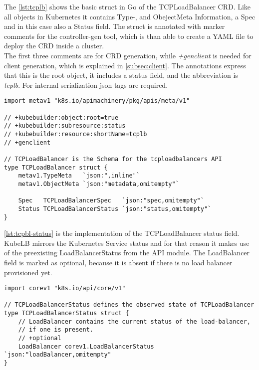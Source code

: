 The \autoref{lst:tcplb} shows the basic struct in Go of the TCPLoadBalancer CRD.
Like all objects in Kubernetes it contains Type-, and ObejectMeta Information, a Spec and in this case also a Status field.
The struct is annotated with marker comments for the controller-gen tool, which is than able to create a YAML file to deploy the CRD inside a cluster.
\\
The first three comments are for CRD generation, while \textit{+genclient} is needed for client generation, which is explained in \autoref{subsec:client}.
The annotations express that this is the root object, it includes a status field, and the abbreviation is \textit{tcplb}.
For internal serialization json tags are required.

\begin{lstlisting}[caption={TCPLoadBalancer CRD root struct},label={lst:tcplb}]
import metav1 "k8s.io/apimachinery/pkg/apis/meta/v1"

// +kubebuilder:object:root=true
// +kubebuilder:subresource:status
// +kubebuilder:resource:shortName=tcplb
// +genclient

// TCPLoadBalancer is the Schema for the tcploadbalancers API
type TCPLoadBalancer struct {
	metav1.TypeMeta   `json:",inline"`
	metav1.ObjectMeta `json:"metadata,omitempty"`

	Spec   TCPLoadBalancerSpec   `json:"spec,omitempty"`
	Status TCPLoadBalancerStatus `json:"status,omitempty"`
}
\end{lstlisting}

\newpage

\autoref{lst:tcpbl-status} is the implementation of the TCPLoadBalancer status field.
KubeLB mirrors the Kubernetes Service status and for that reason it makes use of the preexisting LoadBalancerStatus from the API module.
The LoadBalancer field is marked as optional, because it is absent if there is no load balancer provisioned yet.

\begin{lstlisting}[caption={TCPLoadBalancerStatus struct}, label={lst:tcpbl-status}]
import corev1 "k8s.io/api/core/v1"

// TCPLoadBalancerStatus defines the observed state of TCPLoadBalancer
type TCPLoadBalancerStatus struct {
	// LoadBalancer contains the current status of the load-balancer,
	// if one is present.
	// +optional
	LoadBalancer corev1.LoadBalancerStatus `json:"loadBalancer,omitempty"
}
\end{lstlisting}

